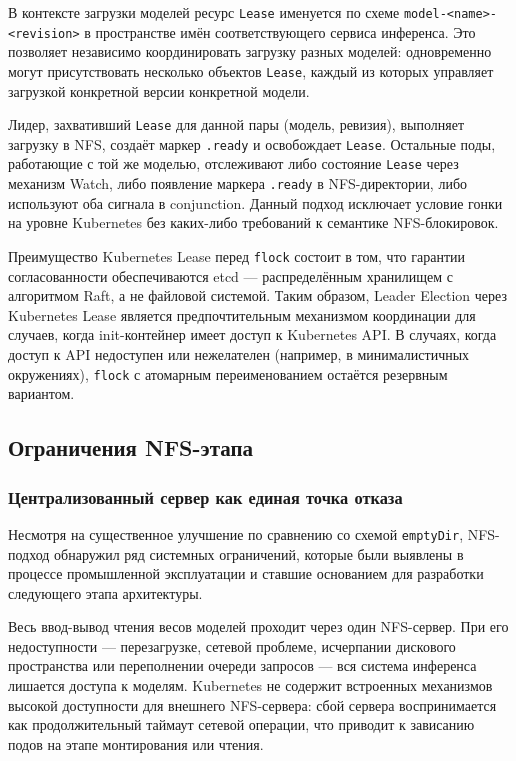 В контексте загрузки моделей ресурс \texttt{Lease} именуется по схеме \texttt{model-<name>-<revision>} в пространстве имён соответствующего сервиса инференса. Это позволяет независимо координировать загрузку разных моделей: одновременно могут присутствовать несколько объектов \texttt{Lease}, каждый из которых управляет загрузкой конкретной версии конкретной модели.

Лидер, захвативший \texttt{Lease} для данной пары (модель, ревизия), выполняет загрузку в NFS, создаёт маркер \texttt{.ready} и освобождает \texttt{Lease}. Остальные поды, работающие с той же моделью, отслеживают либо состояние \texttt{Lease} через механизм Watch, либо появление маркера \texttt{.ready} в NFS-директории, либо используют оба сигнала в conjunction. Данный подход исключает условие гонки на уровне Kubernetes без каких-либо требований к семантике NFS-блокировок.

Преимущество Kubernetes Lease перед \texttt{flock} состоит в том, что гарантии согласованности обеспечиваются etcd --- распределённым хранилищем с алгоритмом Raft, а не файловой системой. Таким образом, Leader Election через Kubernetes Lease является предпочтительным механизмом координации для случаев, когда init-контейнер имеет доступ к Kubernetes API. В случаях, когда доступ к API недоступен или нежелателен (например, в минималистичных окружениях), \texttt{flock} с атомарным переименованием остаётся резервным вариантом.

\subsection{Ограничения NFS-этапа}

\subsubsection{Централизованный сервер как единая точка отказа}

Несмотря на существенное улучшение по сравнению со схемой \texttt{emptyDir}, NFS-подход обнаружил ряд системных ограничений, которые были выявлены в процессе промышленной эксплуатации и ставшие основанием для разработки следующего этапа архитектуры.

 Весь ввод-вывод чтения весов моделей проходит через один NFS-сервер. При его недоступности --- перезагрузке, сетевой проблеме, исчерпании дискового пространства или переполнении очереди запросов --- вся система инференса лишается доступа к моделям. Kubernetes не содержит встроенных механизмов высокой доступности для внешнего NFS-сервера: сбой сервера воспринимается как продолжительный таймаут сетевой операции, что приводит к зависанию подов на этапе монтирования или чтения.

